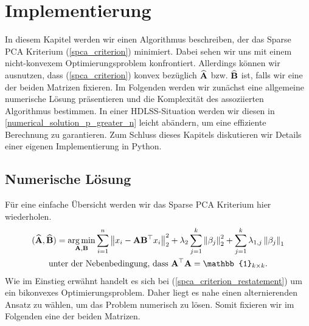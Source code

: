 \chapter{Implementierung}

\label{implementation}

In diesem Kapitel werden wir einen Algorithmus beschreiben, der das Sparse PCA Kriterium (\ref{spca_criterion}) minimiert. Dabei sehen wir uns mit einem nicht-konvexem Optimierungsproblem konfrontiert. Allerdings können wir ausnutzen, dass (\ref{spca_criterion}) konvex bezüglich $\widehat{\mathbf{A}}$ bzw. $\widehat{\mathbf{B}}$ ist, falls wir eine der beiden Matrizen fixieren. Im Folgenden werden wir zunächst eine allgemeine numerische Lösung präsentieren und die Komplexität des assoziierten Algorithmus bestimmen. In einer HDLSS-Situation werden wir diesen in \ref{numerical_solution_p_greater_n} leicht abändern, um eine effiziente Berechnung zu garantieren. Zum Schluss dieses Kapitels diskutieren wir Details einer eigenen Implementierung in Python.




\section{Numerische Lösung}
\label{spca_numerical_solution}

Für eine einfache Übersicht werden wir das Sparse PCA Kriterium hier wiederholen.
\begin{align}
\label{spca_criterion_restatement}
\begin{gathered}
(\widehat{\mat{A}}, \widehat{\mat{B}}) = \argmin_{\mat{A}, \mat{B}} \sum_{i=1}^{n} \norm{x_i - \mat{A}\mat{B}^{\top}x_i}_2^2 + \lambda_2 \sum_{j=1}^{k}\norm{\beta_j}_2^2 + \sum_{j=1}^k \lambda_{1,j} \norm{\beta_j}_1\\
\text{unter der Nebenbedingung, dass } \mat{A}^{\top}\mat{A} = \mat{\mathbb{1}}_{k \times k}.
\end{gathered}
\end{align}
Wie im Einstieg erwähnt handelt es sich bei (\ref{spca_criterion_restatement}) um ein bikonvexes Optimierungsproblem. Daher liegt es nahe einen alternierenden Ansatz zu wählen, um das Problem numerisch zu lösen. Somit fixieren wir im Folgenden eine der beiden Matrizen.

